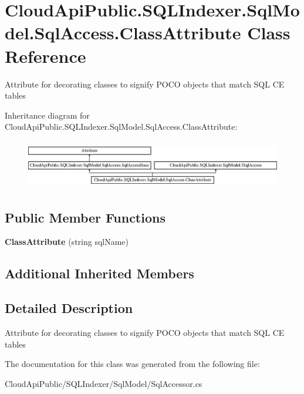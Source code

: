 \hypertarget{class_cloud_api_public_1_1_s_q_l_indexer_1_1_sql_model_1_1_sql_access_1_1_class_attribute}{\section{Cloud\-Api\-Public.\-S\-Q\-L\-Indexer.\-Sql\-Model.\-Sql\-Access.\-Class\-Attribute Class Reference}
\label{class_cloud_api_public_1_1_s_q_l_indexer_1_1_sql_model_1_1_sql_access_1_1_class_attribute}
}


Attribute for decorating classes to signify P\-O\-C\-O objects that match S\-Q\-L C\-E tables  


Inheritance diagram for Cloud\-Api\-Public.\-S\-Q\-L\-Indexer.\-Sql\-Model.\-Sql\-Access.\-Class\-Attribute\-:\begin{figure}[H]
\begin{center}
\leavevmode
\includegraphics[height=2.164948cm]{class_cloud_api_public_1_1_s_q_l_indexer_1_1_sql_model_1_1_sql_access_1_1_class_attribute}
\end{center}
\end{figure}
\subsection*{Public Member Functions}
\begin{DoxyCompactItemize}
\item 
\hypertarget{class_cloud_api_public_1_1_s_q_l_indexer_1_1_sql_model_1_1_sql_access_1_1_class_attribute_add2719b626098a576225270ea018c412}{{\bfseries Class\-Attribute} (string sql\-Name)}\label{class_cloud_api_public_1_1_s_q_l_indexer_1_1_sql_model_1_1_sql_access_1_1_class_attribute_add2719b626098a576225270ea018c412}

\end{DoxyCompactItemize}
\subsection*{Additional Inherited Members}


\subsection{Detailed Description}
Attribute for decorating classes to signify P\-O\-C\-O objects that match S\-Q\-L C\-E tables 



The documentation for this class was generated from the following file\-:\begin{DoxyCompactItemize}
\item 
Cloud\-Api\-Public/\-S\-Q\-L\-Indexer/\-Sql\-Model/Sql\-Accessor.\-cs\end{DoxyCompactItemize}
